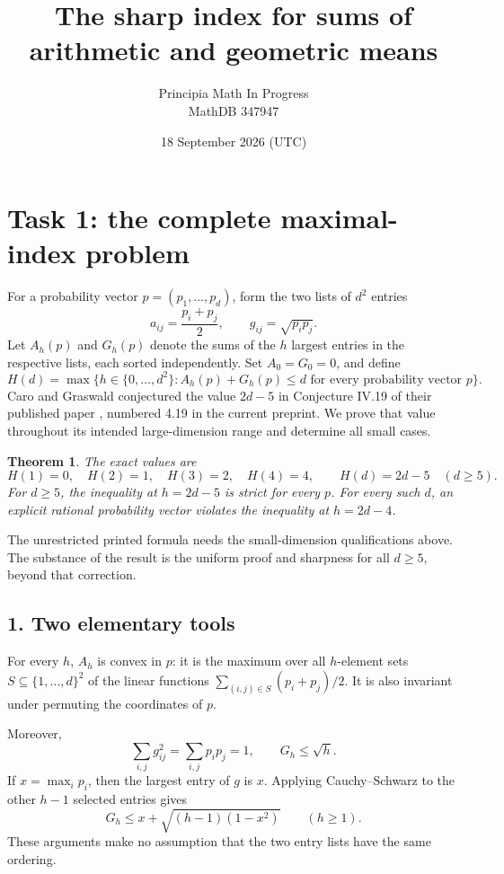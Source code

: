 \documentclass[11pt]{article}
\title{The sharp index for sums of arithmetic and geometric means}
\author{Principia Math In Progress\\MathDB 347947}
\date{18 September 2026 (UTC)}
\newtheorem{theorem}{Theorem}
\begin{document}
\maketitle

\section*{Task 1: the complete maximal-index problem}
For a probability vector $p=(p_1,\ldots,p_d)$, form the two lists
of $d^2$ entries
\[
 a_{ij}=\frac{p_i+p_j}{2},\qquad g_{ij}=\sqrt{p_ip_j}.
\]
Let $A_h(p)$ and $G_h(p)$ denote the sums of the $h$ largest
entries in the respective lists, each sorted independently.
Set $A_0=G_0=0$, and define
\[
 H(d)=\max\{h\in\{0,\ldots,d^2\}: A_h(p)+G_h(p)\le d
              \text{ for every probability vector }p\}.
\]
Caro and Graswald conjectured the value $2d-5$ in
Conjecture IV.19 of their published paper \cite{CG}, numbered
4.19 in the current preprint. We prove that value throughout
its intended large-dimension range and determine all small cases.

\begin{theorem}\label{main}
The exact values are
\[
 \boxed{H(1)=0,\quad H(2)=1,\quad H(3)=2,\quad H(4)=4,
 \qquad H(d)=2d-5\quad(d\ge5).}
\]
For $d\ge5$, the inequality at $h=2d-5$ is strict for every $p$.
For every such $d$, an explicit rational probability vector
violates the inequality at $h=2d-4$.
\end{theorem}

The unrestricted printed formula needs the small-dimension
qualifications above. The substance of the result is the
uniform proof and sharpness for all $d\ge5$, beyond that correction.

\subsection*{1. Two elementary tools}
For every $h$, $A_h$ is convex in $p$: it is the maximum over all
$h$-element sets $S\subseteq\{1,\ldots,d\}^2$ of the linear functions
$\sum_{(i,j)\in S}(p_i+p_j)/2$. It is also invariant under
permuting the coordinates of $p$.

Moreover,
\begin{equation}\label{frobenius}
 \sum_{i,j}g_{ij}^2=\sum_{i,j}p_ip_j=1,
 \qquad G_h\le\sqrt h.
\end{equation}
If $x=\max_i p_i$, then the largest entry of $g$ is $x$.
Applying Cauchy--Schwarz to the other $h-1$ selected entries gives
\begin{equation}\label{refined}
 G_h\le x+\sqrt{(h-1)(1-x^2)}\qquad(h\ge1).
\end{equation}
These arguments make no assumption that the two entry lists
have the same ordering.
\end{document}
